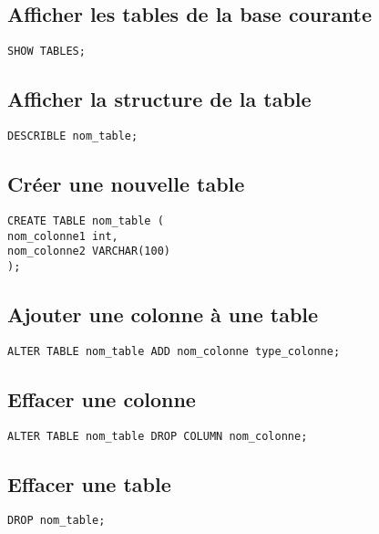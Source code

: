 \documentclass[11pt]{article}
\begin{document}
\subsection{Afficher les tables de la base courante}
\label{sec:org95ec5bc}

\begin{verbatim}
SHOW TABLES;
\end{verbatim}

\subsection{Afficher la structure de la table}
\label{sec:orgab222d4}

\begin{verbatim}
DESCRIBLE nom_table;
\end{verbatim}

\subsection{Créer une nouvelle table}
\label{sec:orga1cd2ab}

\begin{verbatim}
CREATE TABLE nom_table (
nom_colonne1 int,
nom_colonne2 VARCHAR(100)
);
\end{verbatim}

\subsection{Ajouter une colonne à une table}
\label{sec:org4f70d40}
\begin{verbatim}
ALTER TABLE nom_table ADD nom_colonne type_colonne;
\end{verbatim}

\subsection{Effacer une colonne}
\label{sec:org677ae2e}
\begin{verbatim}
ALTER TABLE nom_table DROP COLUMN nom_colonne;
\end{verbatim}

\subsection{Effacer une table}
\label{sec:org24a1492}
\begin{verbatim}
DROP nom_table;
\end{verbatim}
\end{document}
